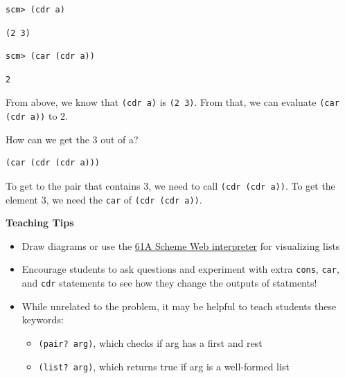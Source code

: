 \begin{lstlisting}
scm> (cdr a)
\end{lstlisting}
\begin{solution}[.25in]
\begin{lstlisting}
(2 3)
\end{lstlisting}
\end{solution}

\begin{lstlisting}
scm> (car (cdr a))
\end{lstlisting}
\begin{solution}[.25in]
\begin{lstlisting}
2
\end{lstlisting}
From above, we know that \texttt{(cdr a)} is \texttt{(2 3)}. From that, we can evaluate \texttt{(car (cdr a))} to 2.
\end{solution}

How can we get the 3 out of a?
\begin{solution}[.25in]
\begin{lstlisting}
(car (cdr (cdr a)))
\end{lstlisting}
To get to the pair that contains 3, we need to call \texttt{(cdr (cdr a))}. To get the element 3, we need the \texttt{car} of \texttt{(cdr (cdr a))}.
\end{solution}

\begin{guide}
\begin{blocksection}
\textbf{Teaching Tips}
\begin{itemize}
  \item Draw diagrams or use the \href{https://code.cs61a.org/}{61A Scheme Web interpreter} for visualizing lists
  \item Encourage students to ask questions and experiment with extra \lstinline{cons}, \lstinline{car}, and \lstinline{cdr} statements to see how they change the outputs of statments!
  \item While unrelated to the problem, it may be helpful to teach students these keywords:
  \begin{itemize}
    \item\lstinline{(pair? arg)}, which checks if arg has a first and rest
    \item\lstinline{(list? arg)}, which returns true if arg is a well-formed list
  \end{itemize}
\end{itemize}
\end{blocksection}
\end{guide}